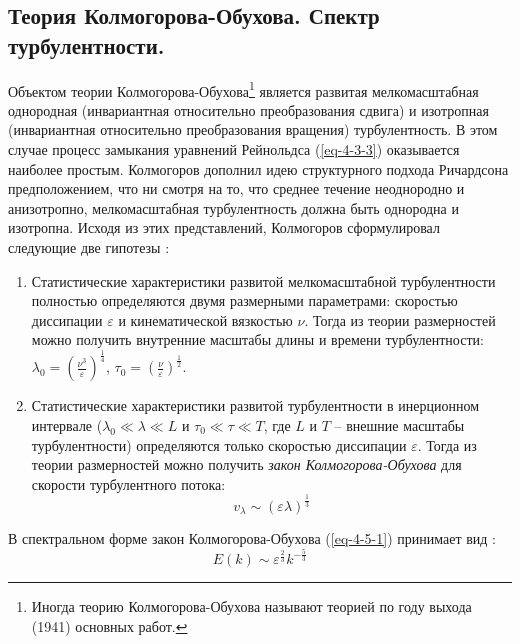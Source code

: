 \subsection{Теория Колмогорова-Обухова. Спектр турбулентности.}
Объектом теории Колмогорова-Обухова\footnote{Иногда теорию Колмогорова-Обухова называют теорией  по году выхода (1941) основных работ.} является развитая мелкомасштабная однородная (инвариантная относительно преобразования сдвига) и изотропная (инвариантная относительно преобразования вращения) турбулентность.
В этом случае процесс замыкания уравнений Рейнольдса (\ref{eq-4-3-3}) оказывается наиболее простым.
Колмогоров дополнил идею структурного подхода Ричардсона предположением, что ни смотря на то, что среднее течение неоднородно и анизотропно, мелкомасштабная турбулентность должна быть однородна и изотропна.
Исходя из этих представлений, Колмогоров сформулировал следующие две гипотезы \cite{Носов-2013}:
\begin{enumerate}
\item Статистические характеристики развитой мелкомасштабной турбулентности полностью определяются двумя размерными параметрами: скоростью диссипации $\varepsilon$ и кинематической вязкостью $\nu$. Тогда из теории размерностей можно получить внутренние масштабы длины и времени турбулентности: $\lambda_0=\left(\frac{\nu^3}{\varepsilon}\right)^\frac{1}{4}$, $\tau_0=\left(\frac{\nu}{\varepsilon}\right)^\frac{1}{2}$.
\item Статистические характеристики развитой турбулентности в инерционном интервале ($\lambda_0\ll\lambda\ll L$ и $\tau_0\ll\tau\ll T$, где $L$ и $T$ -- внешние масштабы турбулентности) определяются только скоростью диссипации $\varepsilon$. Тогда из теории размерностей можно получить \textit{закон Колмогорова-Обухова} для скорости турбулентного потока:\begin{equation}\label{eq-4-5-1}v_\lambda\sim(\varepsilon\lambda)^\frac{1}{3}\end{equation}
\end{enumerate}

В спектральном форме закон Колмогорова-Обухова (\ref{eq-4-5-1}) принимает вид :
\begin{equation}
E(k)\sim\varepsilon^\frac{2}{3}k^{-\frac{5}{3}}
\end{equation}
